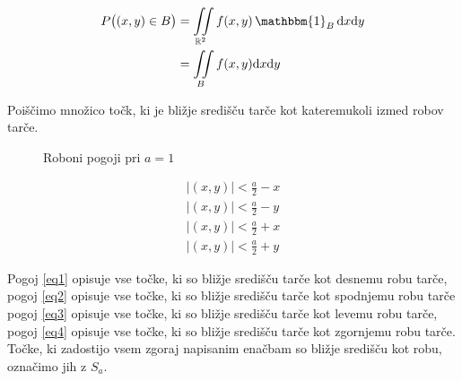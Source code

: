 \documentclass{amsart}
\newcommand{\R}{\mathbb{R}}
\theoremstyle{definition} %
\theoremstyle{plain} %
\begin{document}
\begin{align*}
    P\big((x,y) \in B\big)
    &= \iint\limits_{\R^2} f(x,y) \, \mathbbm{1}_{B} \, \mathrm{d}x\mathrm{d}y \\
    &= \iint\limits_{B} f(x,y) \mathrm{d}x\mathrm{d}y
\end{align*}

Poiščimo množico točk, ki je bližje središču tarče kot kateremukoli izmed robov tarče.

\begin{figure}[!h]
    \centering
    \caption{Roboni pogoji pri $a=1$}
\end{figure}

\begin{align}
    |(x,y)| < \frac{a}{2} - x \label{eq1} \\
    |(x,y)| < \frac{a}{2} - y \label{eq2} \\
    |(x,y)| < \frac{a}{2} + x \label{eq3} \\
    |(x,y)| < \frac{a}{2} + y \label{eq4}
\end{align}

Pogoj \eqref{eq1} opisuje vse točke, ki so bližje središču tarče kot desnemu robu tarče,
pogoj \eqref{eq2} opisuje vse točke, ki so bližje središču tarče kot spodnjemu robu tarče
pogoj \eqref{eq3} opisuje vse točke, ki so bližje središču tarče kot levemu robu tarče,
pogoj \eqref{eq4} opisuje vse točke, ki so bližje središču tarče kot zgornjemu robu tarče.
Točke, ki zadostijo vsem zgoraj napisanim enačbam so bližje središču kot robu, označimo jih z $S_a$.
\end{document}
